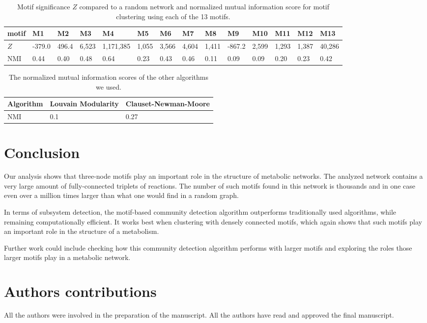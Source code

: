 \begin{table}[t!]
\begin{tabular}{l|lllllllllllll}
    motif & M1 & M2 & M3 & M4 & M5 & M6 & M7 & M8 & M9 & M10 & M11 & M12 & M13
    \\ \hline
    $Z$ & -379.0 & 496.4 & 6,523 & 1,171,385 & 1,055 & 3,566 & 4,604 & 1,411 &
    -867.2 & 2,599 & 1,293 & 1,387 & 40,286 \\
    NMI & 0.44 & 0.40 & 0.48 & 0.64 & 0.23 & 0.43 & 0.46 & 0.11 & 0.09 & 0.09 &
    0.20 & 0.23 & 0.42
  \end{tabular}
  \caption{Motif significance $Z$ compared to a random network and normalized
    mutual information score for motif clustering using each of the 13 motifs.}
  \label{tab:motifs}
\end{table}

\begin{table}[t!]
  \centering
  \begin{tabular}{l|ll}
    Algorithm & Louvain Modularity & Clauset-Newman-Moore \\ \hline
    NMI & 0.1 & 0.27
  \end{tabular}
  \caption{The normalized mutual information scores of the other algorithms we
    used.}
  \label{tab:others}
\end{table}

\section{Conclusion}

Our analysis shows that three-node motifs play an important role in the
structure of metabolic networks. The analyzed network contains a very large
amount of fully-connected triplets of reactions. The number of such motifs found
in this network is thousands and in one case even over a million times larger
than what one would find in a random graph.

In terms of subsystem detection, the motif-based community detection algorithm
outperforms traditionally used algorithms, while remaining computationally
efficient. It works best when clustering with densely connected motifs, which
again shows that such motifs play an important role in the structure of a
metabolism.

Further work could include checking how this community detection algorithm
performs with larger motifs and exploring the roles those larger motifs play in
a metabolic network.

\section{Authors contributions}
All the authors were involved in the preparation of the manuscript.
All the authors have read and approved the final manuscript.

